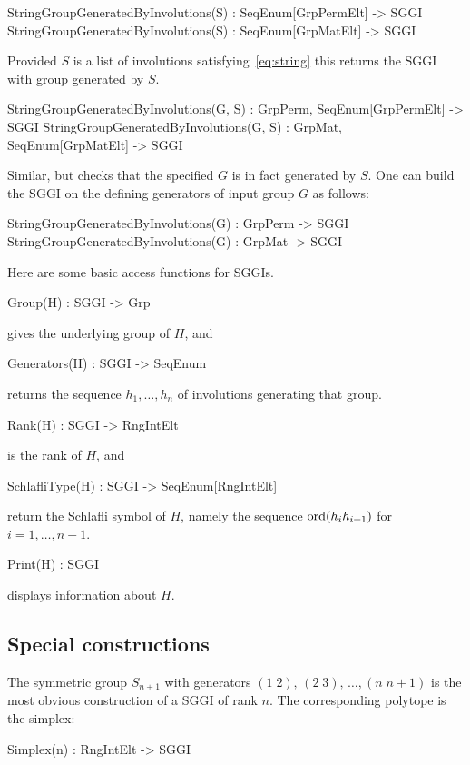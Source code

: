 \documentclass{documentation}
\begin{document}
\begin{intrinsics}
StringGroupGeneratedByInvolutions(S) : SeqEnum[GrpPermElt] -> SGGI
StringGroupGeneratedByInvolutions(S) : SeqEnum[GrpMatElt] -> SGGI
\end{intrinsics}
Provided $S$ is a list of involutions satisfying~\eqref{eq:string} this returns the SGGI with group generated by $S$.
\begin{intrinsics}
StringGroupGeneratedByInvolutions(G, S) : GrpPerm, SeqEnum[GrpPermElt] -> SGGI
StringGroupGeneratedByInvolutions(G, S) : GrpMat, SeqEnum[GrpMatElt] -> SGGI
\end{intrinsics}
Similar, but checks that the specified $G$ is in fact generated by $S$. One can build the SGGI on the defining generators 
of input group $G$ as follows:
\begin{intrinsics}
StringGroupGeneratedByInvolutions(G) : GrpPerm -> SGGI
StringGroupGeneratedByInvolutions(G) : GrpMat  -> SGGI
\end{intrinsics}
Here are some basic access functions for SGGIs.
\begin{intrinsics}
Group(H) : SGGI -> Grp
\end{intrinsics}
gives the underlying group of $H$, and
\begin{intrinsics}
Generators(H) : SGGI -> SeqEnum
\end{intrinsics}
returns the sequence $h_1,\ldots,h_n$ of involutions generating that group.
\begin{intrinsics}
Rank(H) : SGGI -> RngIntElt
\end{intrinsics}
is the rank of $H$, and
\begin{intrinsics}
SchlafliType(H) : SGGI -> SeqEnum[RngIntElt]
\end{intrinsics}
return the Schlafli symbol of $H$, namely the sequence ${\rm ord}(h_ih_{i+1})$ for $i=1,\ldots,n-1$.
\begin{intrinsics}
Print(H) : SGGI 
\end{intrinsics}
displays information about $H$.


\subsection{Special constructions}
\label{sec:special}
The symmetric group $S_{n+1}$ with generators $(1\;2),\,(2\;3),\,\ldots,(n\;n+1)$ is the most obvious 
construction of a SGGI of rank $n$. The corresponding polytope is the simplex:
\begin{intrinsics}
Simplex(n) : RngIntElt -> SGGI
\end{intrinsics}
\end{document}
